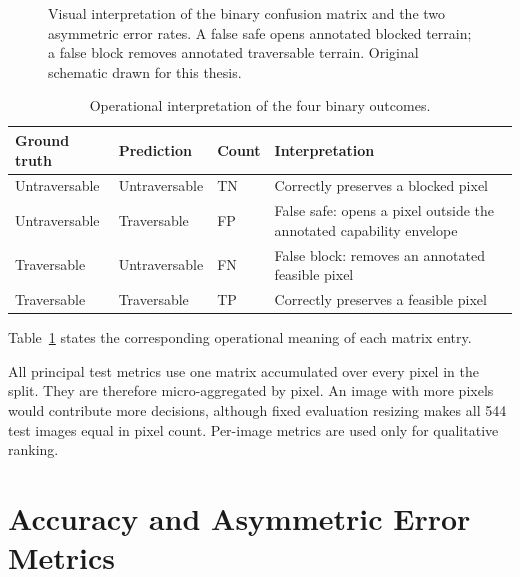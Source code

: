 \begin{figure}[H]
\centering
\resizebox{\textwidth}{!}{}
\caption[Visual interpretation of the binary confusion matrix.]{Visual
interpretation of the binary confusion matrix and the two asymmetric error
rates. A false safe opens annotated blocked terrain; a false block removes
annotated traversable terrain. Original schematic drawn for this thesis.}
\label{fig:confusion_matrix_visual}
\end{figure}

\begin{table}[H]
\centering
\caption{Operational interpretation of the four binary outcomes.}
\label{tab:confusion_interpretation}
\small
\begin{tabularx}{\textwidth}{@{}lllX@{}}
\toprule
\textbf{Ground truth} & \textbf{Prediction} & \textbf{Count} & \textbf{Interpretation} \\
\midrule
Untraversable & Untraversable & TN & Correctly preserves a blocked pixel \\
Untraversable & Traversable & FP & False safe: opens a pixel outside the annotated capability envelope \\
Traversable & Untraversable & FN & False block: removes an annotated feasible pixel \\
Traversable & Traversable & TP & Correctly preserves a feasible pixel \\
\bottomrule
\end{tabularx}
\end{table}

Table~\ref{tab:confusion_interpretation} states the corresponding operational
meaning of each matrix entry.

All principal test metrics use one matrix accumulated over every pixel in the
split. They are therefore micro-aggregated by pixel. An image with more pixels
would contribute more decisions, although fixed evaluation resizing makes all
544 test images equal in pixel count. Per-image metrics are used only for
qualitative ranking.

\section{Accuracy and Asymmetric Error Metrics}

